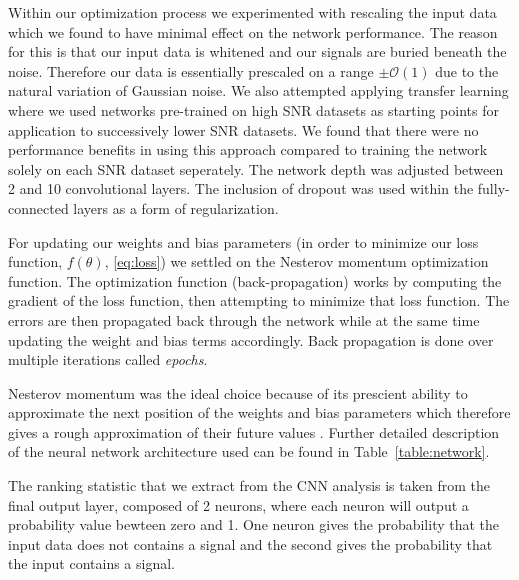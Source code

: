 \documentclass[%
showpacs,
 amsmath,amssymb,
 aps,
 twocolumn,
 prl,
 reprint,
floatfix,
]{revtex4-1}
\begin{document}
%
%
Within our optimization process we experimented with rescaling the input data
which we found to have minimal effect on the network performance. The reason
for this is that our input data is whitened and our signals are buried beneath
the noise. Therefore our data is essentially prescaled on a range
$\pm\mathcal{O}(1)$ due to the natural variation of Gaussian noise. We also
attempted applying transfer learning \cite{5288526}
where we used networks pre-trained on high \ac{SNR} datasets as starting points
for application to successively lower \ac{SNR} datasets. We found that there
were no performance benefits in using this approach compared to training the network 
solely on each \ac{SNR} dataset seperately. The network depth was adjusted
between 2 and 10 convolutional layers. The
inclusion of dropout was used within the fully-connected layers as a form of
regularization.

%
%
For updating our weights and bias parameters (in
order to minimize our loss function, $f(\theta)$, \eqref{eq:loss}) we settled
on the Nesterov momentum optimization function. The optimization function (back-propagation) works by
computing the gradient of the loss function, then attempting to minimize 
that loss function. The errors are then propagated back through the network while at the same time 
updating the weight and bias terms accordingly.  Back propagation is done over multiple iterations called \textit{epochs}. 



Nesterov momentum was the ideal choice because of its prescient ability to
approximate the next position of the weights and bias parameters which
therefore gives a rough approximation of their future values
\cite{Sutskever:2013:IIM:3042817.3043064}. Further detailed description of the
neural network architecture used can be found in
Table~\ref{table:network}. 

The ranking statistic that we extract from the CNN analysis is taken from the final output layer,
composed of 2 neurons, where each neuron will output a probability value bewteen zero and 1. One 
neuron gives the probability that the input data does not contains a signal and the second gives 
the probability that the input contains a signal.
\end{document}
